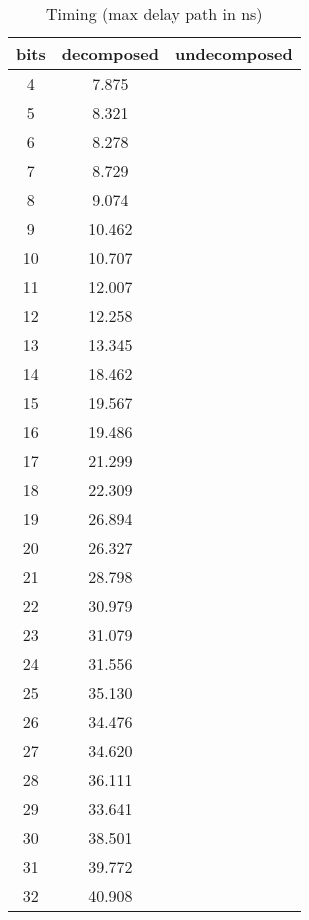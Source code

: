 \documentclass{article}
\begin{document}
\begin{table}[h]
\centering
\begin{tabular}{c | c | c }
bits	 & decomposed	 & undecomposed \\ 
\hline4	 & 7.875	 &  \\ 
5	 & 8.321	 &  \\ 
6	 & 8.278	 &  \\ 
7	 & 8.729	 &  \\ 
8	 & 9.074	 &  \\ 
9	 & 10.462	 &  \\ 
10	 & 10.707	 &  \\ 
11	 & 12.007	 &  \\ 
12	 & 12.258	 &  \\ 
13	 & 13.345	 &  \\ 
14	 & 18.462	 &  \\ 
15	 & 19.567	 &  \\ 
16	 & 19.486	 &  \\ 
17	 & 21.299	 &  \\ 
18	 & 22.309	 &  \\ 
19	 & 26.894	 &  \\ 
20	 & 26.327	 &  \\ 
21	 & 28.798	 &  \\ 
22	 & 30.979	 &  \\ 
23	 & 31.079	 &  \\ 
24	 & 31.556	 &  \\ 
25	 & 35.130	 &  \\ 
26	 & 34.476	 &  \\ 
27	 & 34.620	 &  \\ 
28	 & 36.111	 &  \\ 
29	 & 33.641	 &  \\ 
30	 & 38.501	 &  \\ 
31	 & 39.772	 &  \\ 
32	 & 40.908	 &  \\ 
\end{tabular}
\caption{Timing (max delay path in ns)}
\end{table}
\end{document}
